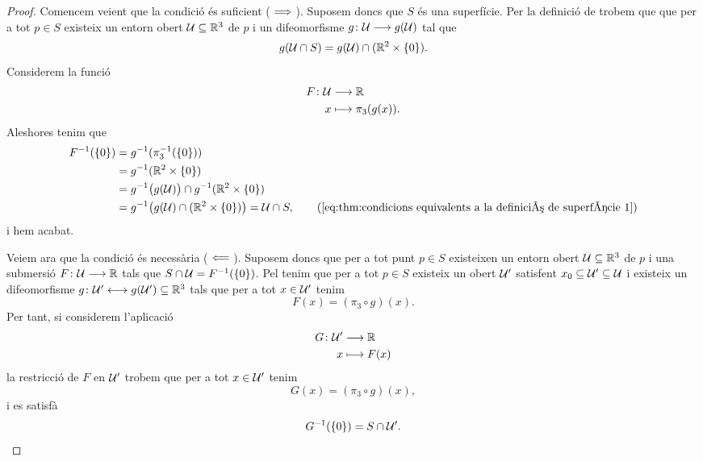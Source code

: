 \documentclass[../Apunts.tex]{subfiles}
\begin{document}
	\begin{proof}
		Comencem veient que la condició és suficient (\(\implies\)). Suposem doncs que \(S\) és una superfície. Per la definició de  trobem que que per a tot \(p\in S\) existeix un entorn obert \(\mathcal{U}\subseteq\mathbb{R}^{3}\) de \(p\) i un difeomorfisme \(g\colon\mathcal{U}\longrightarrow g(\mathcal{U})\) tal que
		\begin{equation}
			\label{eq:thm:condicions equivalents a la definició de superfície 1}
			g(\mathcal{U}\cap S)=g(\mathcal{U})\cap(\mathbb{R}^{2}\times\{0\}).
		\end{equation}
		Considerem la funció
		\begin{align*}
			F\colon\mathcal{U}&\longrightarrow\mathbb{R} \\
			x&\longmapsto\pi_{3}(g(x)).
		\end{align*}
		Aleshores tenim que
		\begin{align*}
			F^{-1}(\{0\})&=g^{-1}(\pi_{3}^{-1}(\{0\})) \\
			&=g^{-1}(\mathbb{R}^{2}\times\{0\}) \\
			&=g^{-1}\big(g(\obert{U})\big)\cap g^{-1}(\mathbb{R}^{2}\times\{0\})\\
			&=g^{-1}\big(g(\obert{U})\cap(\mathbb{R}^{2}\times\{0\})\big)=\obert{U}\cap S, \tag{\ref{eq:thm:condicions equivalents a la definició de superfície 1}} %
		\end{align*}
		i hem acabat.
		
		Veiem ara que la condició és necessària (\(\impliedby\)). Suposem doncs que per a tot punt \(p\in S\) existeixen un entorn obert \(\mathcal{U}\subseteq\mathbb{R}^{3}\) de \(p\) i una submersió \(F\colon\mathcal{U}\longrightarrow\mathbb{R}\) tals que \(S\cap\mathcal{U}=F^{-1}(\{0\})\). Pel  tenim que per a tot \(p\in S\) existeix un obert \(\mathcal{U}'\) satisfent \(x_{0}\subseteq\mathcal{U}'\subseteq\mathcal{U}\) i existeix un difeomorfisme \(g\colon\mathcal{U}'\longleftrightarrow g(\mathcal{U}')\subseteq\mathbb{R}^{3}\) tals que per a tot \(x\in\mathcal{U}'\) tenim
		\[F(x)=(\pi_{3}\circ g)(x).\]
		Per tant, si considerem l'aplicació
		\begin{align*}
			G\colon\mathcal{U}'&\longrightarrow\mathbb{R} \\
			x&\longmapsto F(x)
		\end{align*}
		la restricció de \(F\) en \(\mathcal{U}'\) trobem que per a tot \(x\in\mathcal{U}'\) tenim
		\[G(x)=(\pi_{3}\circ g)(x),\]
		i es satisfà
		\begin{equation}
			\label{eq:thm:condicions equivalents a la definició de superfície 2}
			G^{-1}(\{0\})=S\cap\mathcal{U}'.
		\end{equation}
		

\end{proof}
\end{document}
